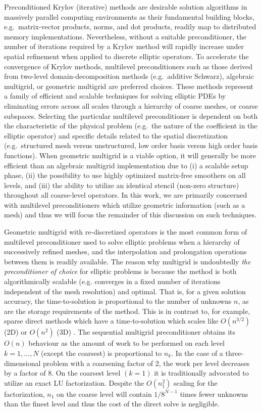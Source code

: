 \documentclass[]{siamart0216}
\begin{document}
Preconditioned Krylov (iterative) methods are desirable solution algorithms in massively parallel computing environments as their 
fundamental building blocks, e.g.~matrix-vector products, norms, and dot products, readily map to distributed memory 
implementations. Nevertheless, without a suitable preconditioner, the number of iterations required by a Krylov method 
will rapidly increase under spatial refinement when applied to discrete elliptic operators.
To accelerate the convergence of Krylov methods, multilevel preconditioners such as those derived from two-level 
domain-decomposition methods (e.g.~additive Schwarz), algebraic multigrid, or geometric multigrid are preferred choices. 
These methods represent a family of efficient and scalable techniques for solving elliptic PDEs by eliminating errors 
across all  scales through a hierarchy of coarse meshes, or coarse subspaces. 
Selecting the particular multilevel preconditioner is dependent on both the characteristic of the physical problem 
(e.g.~the nature of the coefficient in the elliptic operator) and specific details related to the spatial discretization 
(e.g.~structured mesh versus unstructured, low order basis versus high order basis functions).
When geometric multigrid is a viable option, it will generally be more efficient than an algebraic 
multigrid implementation due to 
(i)  a scalable setup phase, 
(ii) the possibility to use highly optimized matrix-free smoothers on all levels, 
and (iii) the ability to utilize an identical stencil (non-zero structure) throughout all coarse-level operators. 
In this work, we are primarily concerned with multilevel preconditioners which utilize geometric 
information (such as a mesh) and thus we will focus the remainder of this discussion on such techniques. 


Geometric multigrid with re-discretized operators is the most common form of multilevel preconditioner used to solve 
elliptic problems when a hierarchy of successively refined meshes, and the interpolation and prolongation operations between them 
is readily available. 
The reason why multigrid is undoubtedly \textit{the preconditioner of choice} for elliptic problems 
is because the method is both algorithmically scalable (e.g. converges in a fixed number of 
iterations independent of the mesh resolution) and optimal. 
That is, for a given solution accuracy, the time-to-solution 
is proportional to the number of unknowns $n$, as are the storage requirements of the method. 
This is in contrast to, for example, sparse direct methods which have a time-to-solution which 
scales like $O(n^{3/2})$ (2D) or $O(n^2)$ (3D)  \cite{li2007use}.
The sequential multigrid preconditioner obtains its $O(n)$ behaviour as the amount of work 
to be performed on each level $k = 1, \dots, N$ (except the coarsest) is proportional to $n_k$. 
In the case of a three-dimensional problem with a coarsening factor of 2, the work per level decreases by a factor of $8$. 
On the coarsest level $(k=1)$ it is traditionally advocated to utilize an exact LU factorization. 
Despite the $O(n_1^2)$ scaling for the factorization, $n_1$ on the coarse level  
will contain $1/8^{N-1}$ times fewer unknowns than the finest level and thus the cost of the direct solve is negligible.   
\end{document}
